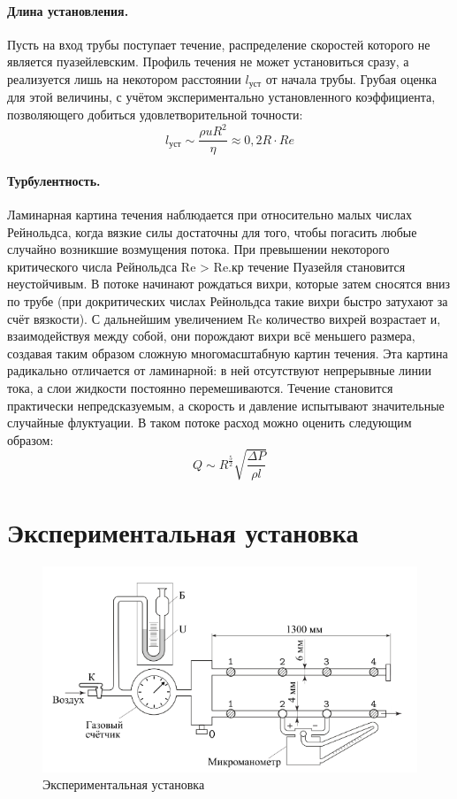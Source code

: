 \documentclass[14pt, a4paper]{report}
\begin{document}
\paragraph{Длина установления.} Пусть на вход трубы поступает течение, распределение скоростей которого не является пуазейлевским. Профиль течения не может установиться сразу, а реализуется лишь на некотором расстоянии $l_{уст}$ от начала трубы. Грубая оценка для этой величины, с учётом экспериментально установленного коэффициента, позволяющего добиться удовлетворительной точности:
\[l_{уст} \sim \frac{\rho u R^{2} }{\eta} \approx 0,2 R \cdot Re\]
\paragraph{Турбулентность.} Ламинарная картина течения наблюдается при относительно малых числах Рейнольдса, когда вязкие силы достаточны для того,
чтобы погасить любые случайно возникшие возмущения потока. При превышении некоторого критического числа Рейнольдса Re > Re.кр течение Пуазейля становится неустойчивым. В потоке начинают рождаться вихри, которые затем сносятся вниз по трубе (при докритических числах Рейнольдса такие вихри быстро затухают за счёт вязкости). С дальнейшим увеличением Re
количество вихрей возрастает и, взаимодействуя между собой, они порождают вихри всё меньшего размера, создавая таким образом сложную многомасштабную картин течения. Эта картина радикально отличается от ламинарной: в ней отсутствуют непрерывные
линии тока, а слои жидкости постоянно перемешиваются. Течение становится практически непредсказуемым, а скорость и давление испытывают значительные случайные флуктуации. В таком потоке расход можно оценить следующим образом:
\[Q\sim R^\frac{5}{2}\sqrt{\frac{\Delta P}{\rho l}}\]

\section{Экспериментальная установка}

\begin{figure}[!ht]
\centering
\includegraphics[width=0.6\linewidth]{terma3_0.png}
\caption{Экспериментальная установка}
\end{figure}
\end{document}

